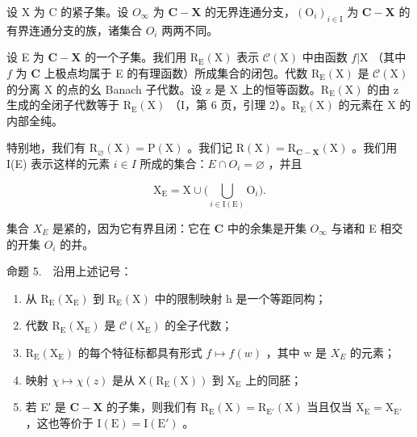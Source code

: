 设 X 为 C 的紧子集。设 \(O_{\infty}\) 为 \(\mathbf{C} - \mathbf{X}\) 的无界连通分支，\((\mathrm{O}_{i})_{i\in\mathrm{I}}\) 为 \(\mathbf{C} - \mathbf{X}\) 的有界连通分支的族，诸集合 \(O_{i}\) 两两不同。

设 E 为 \(\mathbf{C} - \mathbf{X}\) 的一个子集。我们用 \(\mathrm{R}_{\mathrm{E}}(\mathrm{X})\) 表示 \(\mathcal{C}(\mathrm{X})\) 中由函数 \(f|\mathrm{X}\) （其中 \(f\) 为 \(\mathbf{C}\) 上极点均属于 E 的有理函数）所成集合的闭包。代数 \(\mathrm{R}_{\mathrm{E}}(\mathrm{X})\) 是 \(\mathcal{C}(\mathrm{X})\) 的分离 X 的点的幺 Banach 子代数。设 z 是 X 上的恒等函数。\(\mathrm{R}_{\mathrm{E}}(\mathrm{X})\) 的由 z 生成的全闭子代数等于 \(\mathrm{R}_{\mathrm{E}}(\mathrm{X})\) （I，第 6 页，引理 2）。\(\mathrm{R}_{\mathrm{E}}(\mathrm{X})\) 的元素在 X 的内部全纯。

特别地，我们有 \(\mathrm{R}_{\varnothing}(\mathrm{X})=\mathrm{P}(\mathrm{X})\) 。我们记 \(\mathrm{R}(\mathrm{X})=\mathrm{R}_{\mathbf{C}-\mathbf{X}}(\mathrm{X})\) 。我们用 I(E) 表示这样的元素 \(i\in I\) 所成的集合：\(E\cap O_{i}=\varnothing\) ，并且

\[
\mathrm{X} _ {\mathrm{E}} = \mathrm{X} \cup \Big (\bigcup_ {i \in \mathrm{I} (\mathrm{E})} \mathrm{O} _ {i} \Big).
\]

集合 \(X_{E}\) 是紧的，因为它有界且闭：它在 \(\mathbf{C}\) 中的余集是开集 \(O_{\infty}\) 与诸和 E 相交的开集 \(O_{i}\) 的并。

命题 5.　沿用上述记号：

\begin{enumerate}
\def\labelenumi{\alph{enumi})}
\item
  从 \(\mathrm{R}_{\mathrm{E}}(\mathrm{X}_{\mathrm{E}})\) 到 \(\mathrm{R}_{\mathrm{E}}(\mathrm{X})\) 中的限制映射 h 是一个等距同构；
\item
  代数 \(\mathrm{R}_{\mathrm{E}}(\mathrm{X}_{\mathrm{E}})\) 是 \(\mathcal{C}(\mathrm{X}_{\mathrm{E}})\) 的全子代数；
\item
  \(\mathrm{R}_{\mathrm{E}}(\mathrm{X}_{\mathrm{E}})\) 的每个特征标都具有形式 \(f \mapsto f(w)\) ，其中 w 是 \(X_{E}\) 的元素；
\item
  映射 \(\chi \mapsto \chi (z)\) 是从 \(\mathsf{X}(\mathrm{R}_{\mathrm{E}}(\mathrm{X}))\) 到 \(\mathrm{X}_{\mathrm{E}}\) 上的同胚；
\item
  若 E′ 是 \(\mathbf{C} - \mathbf{X}\) 的子集，则我们有 \(\mathrm{R}_{\mathrm{E}}(\mathrm{X}) = \mathrm{R}_{\mathrm{E}'}(\mathrm{X})\) 当且仅当 \(\mathrm{X}_{\mathrm{E}} = \mathrm{X}_{\mathrm{E}'}\) ，这也等价于 \(\mathrm{I}(\mathrm{E}) = \mathrm{I}(\mathrm{E}')\) 。
\end{enumerate}

